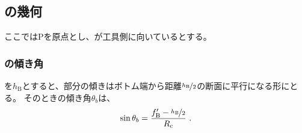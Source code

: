\subsection{\BottomCurvedOutcut の幾何}
ここでは\TableCenter Pを原点とし、\BottomEndFace が工具側に向いているとする。

\subsubsection{\BottomCurvedOutcut の傾き角}
\BottomOutcutLength を$h_\mathrm B$とすると、\nameCurvedOutcut 部分の傾きはボトム端から距離$\nicefrac{h_\mathrm B}2$の断面に平行になる形にとる。
そのときの傾き角$\theta_b$は、
\begin{align}
  \label{eq:BCurvedOutcutAngle}
  \sin\theta_b = \frac{f_\mathrm B'-\nicefrac{h_\mathrm B}2}{R_\mathrm c}\ .
\end{align}

